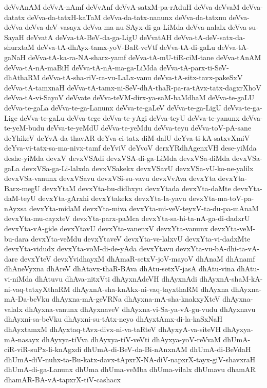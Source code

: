 {deVvAnAM
deVvA-nAmf
deVvAnf
deVvA-satxM-pa-rAduH
deVva
deVvaM
deVva-datatx
deVva-da-tatxH-kaTaM
deVva-da-tatx-nanunx
deVva-da-tatxnu
deVva-deVva
deVva-deV-vasayx
deVva-ma-nu-SAyx-di-ga-LiMda
deVva-nalalx
deVva-su-SayaH
deVvatA
deVva-tA-BeV-da-ga-LigU
deVvatAH
deVva-tA-deV-satx-da-shurxtaM
deVva-tA-dhAyx-tamx-yoV-BaR-veVtf
deVva-tA-di-gaLu
deVva-tA-gaNaH
deVva-tA-ka-ra-NA-sharx-yamf
deVva-tA-mU-tiR-ciM-tane
deVva-tAnAM
deVva-tA-nA-maBiH
deVva-tA-nA-ma-ga-LiMda
deVva-tA-parx-ti-SeV-dhAthaRM
deVva-tA-sha-riV-ra-vu-LaLx-vanu
deVva-tA-sitx-tavx-pakeSxV
deVva-tA-tamxnaH
deVva-tA-tamx-ni-SeV-dhA-thaR-pa-ra-tAvx-tatx-dagxrXhoV
deVva-tA-vi-SayoV
deVvate
deVva-teVM-dirx-ya-saM-baMdhaM
deVva-te-gaLU
deVva-te-gaLa
deVva-te-ga-Lanunx
deVva-te-gaLeV
deVva-te-ga-LigU
deVva-te-ga-Lige
deVva-te-gaLu
deVva-tege
deVva-te-yAgi
deVva-teyU
deVva-te-yanunx
deVva-te-yeM-budu
deVva-te-yeMdU
deVva-te-yeMdu
deVva-teyu
deVva-toV-pA-sane
deYhikeV
deYvA-da-thavAR
deYva-ci-tatx-diM-dalU
deYva-ti-kA-satxvXmiV
deYva-vi-tatx-sa-ma-nivx-tamf
deYviV
deYvoV
derxYRdhAgenxVH
dese-yiMda
deshe-yiMda
devxV
devxVSAdi
devxVSA-di-ga-LiMda
devxVSa-diMda
devxVSa-gaLa
devxVSa-ga-Li-lalxda
devxVSakekx
devxVSavU
devxVSa-vU-ko-ne-yalilx
devxVSa-vanunx
devxVSavu
devxVSi-su-vavu
devxVvAva
devxYta
devxYta-Barx-megU
devxYtaM
devxYta-bu-didhxyu
devxYtada
devxYta-daMte
devxYta-daM-teyU
devxYta-gArxhi
devxYtakekx
devxYta-la-yavu
devxYta-ma-toV-pa-nAyxsa
devxYta-midaM
devxYta-miva
devxYta-mi-veV-teyxV-ta-du-pa-mAnaM
devxYta-mu-cayxteV
devxYta-parx-paMca
devxYta-sa-hi-ta-nA-ga-di-dadxrU
devxYta-vA-gide
devxYtavU
devxYta-vanenxV
devxYta-vanunx
devxYta-veM-bu-dara
devxYta-veMdu
devxYtaveV
devxYta-ve-lalxvU
devxYta-vi-dadxMte
devxYta-vidudx
devxYta-voM-di-de-yAda
devxYtavu
devxYta-vu-bA-dhi-ta-vA-dare
devxYteV
devxYvidhayxM
dhAmaR-setxV-joV-mayoV
dhAnaM
dhAnamf
dhAneVyxna
dhAreV
dhAtavx-thaR-BAva
dhAtu-setxV-jasA
dhAtu-vina
dhAtu-vi-niMda
dhAtuvu
dhAva-nitxVti
dhAyxnAdeVH
dhAyxnAdi
dhAyxnA-shaM-kA-ni-vaq-tatxyXthaRM
dhAyxnA-sha-knAkx-ni-vaq-tayxthaRM
dhAyxna
dhAyxna-mA-Da-beVku
dhAyxna-mA-geVRNa
dhAyxna-mA-sha-knakxyXteV
dhAyxna-valalx
dhAyxna-vanunx
dhAyxnaveV
dhAyxna-vi-Sa-ya-vA-gu-vudu
dhAyxnavu
dhAyxni-sa-beVku
dhAyxni-su-tAtx-neyo
dhAyxtAmx-di-la-kaSxNaH
dhAyxtamxM
dhAyxtaq-tAvx-divx-ni-va-taRteV
dhAyxyA-va-siteVH
dhAyxya-mA-nasayx
dhAyxya-tiVva
dhAyxya-tiV-veVti
dhAyxya-yoV-reVvaM
dhUmA-ciR-viR-suPx-li-knAgxdi
dhUmA-di-BeV-da-Bi-nAnxnAM
dhUmA-di-BeVdaH
dhUmA-diV-nuhx-ta-Bu-katx-davx-tApxrX-NA-diV-napxrX-tayx-giV-shavxraH
dhUmA-di-ga-Lanunx
dhUma
dhUma-veMba
dhUma-vilalx
dhUmavu
dhamAR
dhamAR-BA-vA-tapxrX-tiV-cashacx
}
